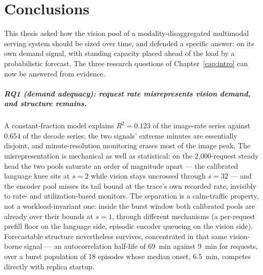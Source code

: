 \chapter{Conclusions}
\label{cap:conclusion}

This thesis asked how the vision pool of a modality-disaggregated multimodal
serving system should be sized over time, and defended a specific answer:
on its own demand signal, with standing capacity placed ahead of the load by
a probabilistic forecast. The three research questions of
Chapter~\ref{cap:intro} can now be answered from evidence.

\paragraph{RQ1 (demand adequacy): request rate misrepresents vision
demand, and structure remains.} A constant-fraction model explains
$R^2=\num{0.123}$ of the image-rate series against \num{0.654} of the decode
series; the two signals' extreme minutes are essentially disjoint, and
minute-resolution monitoring erases most of the image peak. The
misrepresentation is mechanical as well as statistical: on the
2{,}000-request steady head the two pools saturate an order of magnitude
apart --- the calibrated language knee sits at $s{=}2$ while vision stays
uncrossed through $s{=}32$ --- and the encoder pool misses its tail
bound at the trace's own recorded rate, invisibly to rate- and
utilization-based monitors. The separation is a calm-traffic property, not a
workload-invariant one: inside the burst window both calibrated pools are
already over their bounds at $s{=}1$, through different mechanisms (a
per-request prefill floor on the language side, episodic encoder queueing on
the vision side). Forecastable structure nevertheless survives,
concentrated in that same vision-borne signal --- an autocorrelation
half-life of \SI{69}{\minute} against \SI{9}{\minute} for requests, over a
burst population of 18 episodes whose median onset, \SI{6.5}{\minute},
competes directly with replica startup.

